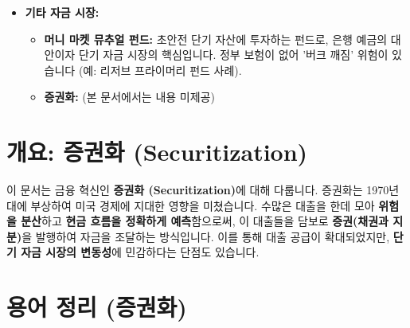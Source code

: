 \documentclass[11pt,a4paper]{article}
\theoremstyle{definition}
\begin{document}
\begin{summarybox}[title=\textbf{모듈 1 핵심 요약: 금리 및 금융 시장}]
\begin{itemize}
\begin{itemize}
        \item \textbf{우상향 곡선:} 경제 확장 및 금리 인상 기대.
        \item \textbf{역전된 곡선:} 경기 침체 및 금리 인하 기대의 강력한 예측 지표.
    \end{itemize}
    \item \textbf{기타 자금 시장:}
    \begin{itemize}
        \item \textbf{머니 마켓 뮤추얼 펀드:} 초안전 단기 자산에 투자하는 펀드로, 은행 예금의 대안이자 단기 자금 시장의 핵심입니다. 정부 보험이 없어 '버크 깨짐' 위험이 있습니다 (예: 리저브 프라이머리 펀드 사례).
        \item \textbf{증권화:} (본 문서에서는 내용 미제공)
    \end{itemize}
\end{itemize}
\end{summarybox}

\newpage

\newpage
\section{개요: 증권화 (Securitization)}

\begin{tcolorbox}[
    colback=lightblue,
    colframe=darkblue,
    title=\textbf{문서 핵심 요약}
]
  이 문서는 금융 혁신인 \textbf{증권화 (Securitization)}에 대해 다룹니다.
  증권화는 1970년대에 부상하여 미국 경제에 지대한 영향을 미쳤습니다.
  수많은 대출을 한데 모아 \textbf{위험을 분산}하고 \textbf{현금 흐름을 정확하게 예측}함으로써,
  이 대출들을 담보로 \textbf{증권(채권과 지분)}을 발행하여 자금을 조달하는 방식입니다.
  이를 통해 대출 공급이 확대되었지만, \textbf{단기 자금 시장의 변동성}에 민감하다는 단점도 있습니다.
\end{tcolorbox}

\newpage
\section{용어 정리 (증권화)}
\end{document}
